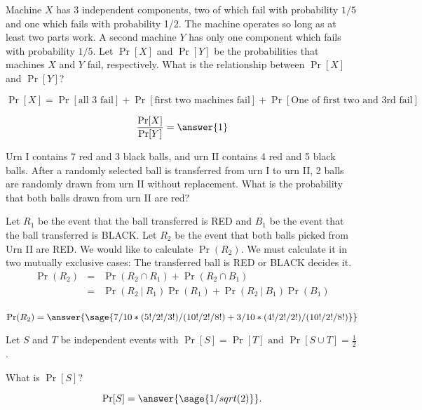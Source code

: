 \documentclass{ximera}
\begin{document}
\begin{problem}
Machine $X$ has 3 independent components, two of which fail with probability $1/5$ and one which fails with probability 1/2. The machine operates so long as at least two parts work. A second machine $Y$ has only one component which fails with probability $1/5$. Let $\Pr[X]$ and $\Pr[Y]$ be the probabilities that machines $X$ and $Y$ fail, respectively. What is the relationship between $\Pr[X]$ and $\Pr[Y]$? 

\begin{hint}
$$
\Pr[X]=\Pr[\text{all 3 fail}]+\Pr[\text{first two machines fail}]+\Pr[\text{One of first two and 3rd fail}] 
$$
\end{hint}

\begin{prompt}
        $$\frac{\Pr[X]}{\Pr[Y]}=\answer{1} $$
\end{prompt}
\end{problem}

\begin{problem}
Urn I contains 7 red and 3 black balls, and urn II contains 4 red and 5 black balls. After a randomly selected ball is transferred from urn I to urn II, 2 balls are randomly drawn from urn II without replacement. What is the probability that both balls drawn from urn II are red? 
\begin{hint}
Let $R_1$ be the event that the ball transferred is RED and $B_1$ be the event that the ball transferred is BLACK. Let $R_2$ be the event that both balls picked from Urn II are RED. We would like to calculate $\Pr(R_2)$. We must calculate it in two mutually exclusive cases: The transferred ball is RED or BLACK decides it. 
\begin{eqnarray*} 
\Pr(R_2)
&=&\Pr(R_2\cap R_1)+\Pr(R_2\cap B_1) \\
&=&\Pr(R_2 ~|~ R_1)\Pr(R_1)+\Pr(R_2~|~ B_1)\Pr(B_1) \\
\end{eqnarray*} 
\end{hint}

\begin{prompt}
$$\Pr(R_2)=\answer{\sage{7/10*(5!/2!/3!)/(10!/2!/8!)+3/10*(4!/2!/2!)/(10!/2!/8!)}}
$$
\end{prompt}

\end{problem}

\begin{problem}
 Let $S$ and $T$ be independent events with $\Pr[S] = \Pr[T] \text{ and }\Pr[S \cup T] = \frac{1}{2}$.

What is $\Pr[S]$? 

\begin{prompt}
$$\Pr[S]=\answer{\sage{1/sqrt(2)}}.$$
\end{prompt}

\end{problem}
\end{document}
